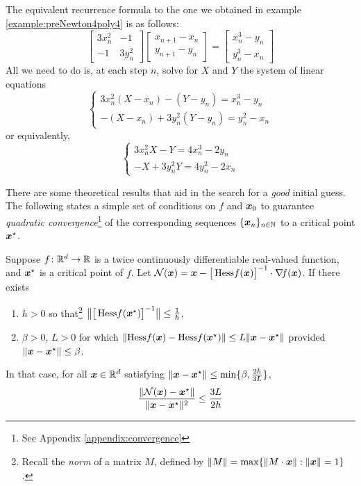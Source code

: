 \begin{example}
The equivalent recurrence formula to the one we obtained in example \ref{example:preNewton4poly4} is as follows:
\begin{equation*}
\begin{bmatrix} 3x_n^2 & -1 \\ -1 & 3y_n^2 \end{bmatrix} \begin{bmatrix} x_{n+1}-x_n \\ y_{n+1}-y_n \end{bmatrix} = \begin{bmatrix} x_n^3 - y_n \\ y_n^3 - x_n \end{bmatrix}
\end{equation*}
All we need to do is, at each step $n$, solve for $X$ and $Y$ the system of linear equations
\begin{equation*}
\begin{cases}
3x_n^2 (X-x_n) - (Y-y_n)  = x_n^3 - y_n \\
-(X-x_n) + 3y_n^2 (Y-y_n) = y_n^2 - x_n
\end{cases}
\end{equation*}
or equivalently,
\begin{equation*}
\begin{cases}
3x_n^2 X - Y = 4x_n^3 - 2y_n \\
-X + 3y_n^2 Y = 4y_n^2 - 2x_n
\end{cases}
\end{equation*}
\end{example}

There are some theoretical results that aid in the search for a \emph{good} initial guess.  The following states a simple set of conditions on $f$ and $\boldsymbol{x}_0$ to guarantee \emph{quadratic convergence}\footnote{See Appendix \ref{appendix:convergence}} of the corresponding sequences $\{ \boldsymbol{x}_n \}_{n \in \mathbb{N}}$ to a critical point $\boldsymbol{x}^{\star}$.

\begin{theorem}\label{theorem:QuadraticConvergence}
Suppose $f\colon \mathbb{R}^d \to \mathbb{R}$ is a twice continuously differentiable real-valued function, and $\boldsymbol{x}^{\star}$ is a critical point of $f$. Let $\mathcal{N}(\boldsymbol{x}) = \boldsymbol{x} - \big[ \mathop{\mathrm{Hess}{f}}(\boldsymbol{x}) \big]^{-1} \cdot \mathop{\nabla\! {f}}(\boldsymbol{x})$. If there exists 
\begin{enumerate}
	\item $h>0$ so that\footnote{Recall the \emph{norm} of a matrix $M$, defined by $\lVert M \rVert = \max\{ \lVert M\cdot \boldsymbol{x} \rVert : \lVert \boldsymbol{x} \rVert=1 \}$.} $\big\lVert \big[ \mathop{\mathrm{Hess}{f}}(\boldsymbol{x}^{\star})\big]^{-1} \big\rVert \leq \tfrac{1}{h}$,
	\item $\beta>0$, $L>0$ for which $\lVert \mathop{\mathrm{Hess}{f}}(\boldsymbol{x}) - \mathop{\mathrm{Hess}{f}}(\boldsymbol{x}^{\star}) \rVert \leq L \lVert  \boldsymbol{x} - \boldsymbol{x}^{\star}  \rVert$ provided $\lVert  \boldsymbol{x} - \boldsymbol{x}^{\star}  \rVert\leq \beta$.
\end{enumerate}
In that case, for all $\boldsymbol{x} \in \mathbb{R}^d$ satisfying $\lVert  \boldsymbol{x} - \boldsymbol{x}^{\star}  \rVert\leq \min \{\beta, \tfrac{2h}{3L} \}$,
\begin{equation*}
\frac{\lVert  \mathcal{N}(\boldsymbol{x}) - \boldsymbol{x}^{\star}  \rVert}{\lVert \boldsymbol{x} - \boldsymbol{x}^{\star} \rVert^2} \leq \frac{3L}{2h}
\end{equation*}
\end{theorem}

